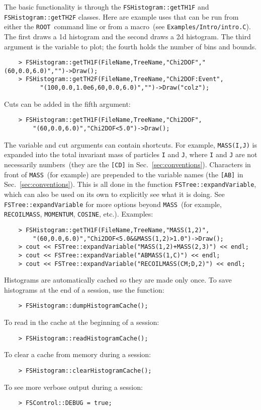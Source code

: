 \documentclass[11pt]{article}
\newcommand{\ROOT}{{\tt ROOT}}
\begin{document}
The basic functionality is through the {\tt FSHistogram::getTH1F} and {\tt FSHistogram::getTH2F} classes.  Here are example uses that can be run from either the \ROOT\ command line or from a macro~(see {\tt Examples/Intro/intro.C}).  The first draws a 1d histogram and the second draws a 2d histogram.  The third argument is the variable to plot; the fourth holds the number of bins and bounds.
\begin{verbatim}
    > FSHistogram::getTH1F(FileName,TreeName,"Chi2DOF","(60,0.0,6.0)","")->Draw();
    > FSHistogram::getTH2F(FileName,TreeName,"Chi2DOF:Event",
          "(100,0.0,1.0e6,60,0.0,6.0)","")->Draw("colz");
\end{verbatim}
Cuts can be added in the fifth argument:
\begin{verbatim}
    > FSHistogram::getTH1F(FileName,TreeName,"Chi2DOF",
        "(60,0.0,6.0)","Chi2DOF<5.0")->Draw();
\end{verbatim}
The variable and cut arguments can contain shortcuts.  For example, {\tt MASS(I,J)} is expanded into the total invariant mass of particles {\tt I} and {\tt J}, where {\tt I} and {\tt J} are not necessarily numbers~(they are the {\tt [CD]} in Sec.~\ref{sec:conventions}).  Characters in front of {\tt MASS}~(for example) are prepended to the variable names (the {\tt [AB]} in Sec.~\ref{sec:conventions}).  This is all done in the function {\tt FSTree::expandVariable}, which can also be used on its own to explicitly see what it is doing.    See {\tt FSTree::expandVariable} for more options beyond {\tt MASS}~(for example, {\tt RECOILMASS}, {\tt MOMENTUM}, {\tt COSINE}, etc.).  Examples:
\begin{verbatim}
    > FSHistogram::getTH1F(FileName,TreeName,"MASS(1,2)",
        "(60,0.0,6.0)","Chi2DOF<5.0&&MASS(1,2)>1.0")->Draw();
    > cout << FSTree::expandVariable("MASS(1,2)+MASS(2,3)") << endl;
    > cout << FSTree::expandVariable("ABMASS(1,C)") << endl;
    > cout << FSTree::expandVariable("RECOILMASS(CM;D,2)") << endl;
\end{verbatim}
Histograms are automatically cached so they are made only once.  To save histograms at the end of a session, use the function:
\begin{verbatim}
    > FSHistogram::dumpHistogramCache(); 
\end{verbatim}
To read in the cache at the beginning of a session:
\begin{verbatim}
    > FSHistogram::readHistogramCache(); 
\end{verbatim}
To clear a cache from memory during a session:
\begin{verbatim}
    > FSHistogram::clearHistogramCache(); 
\end{verbatim}
To see more verbose output during a session:
\begin{verbatim}
    > FSControl::DEBUG = true;
\end{verbatim}
\end{document}
